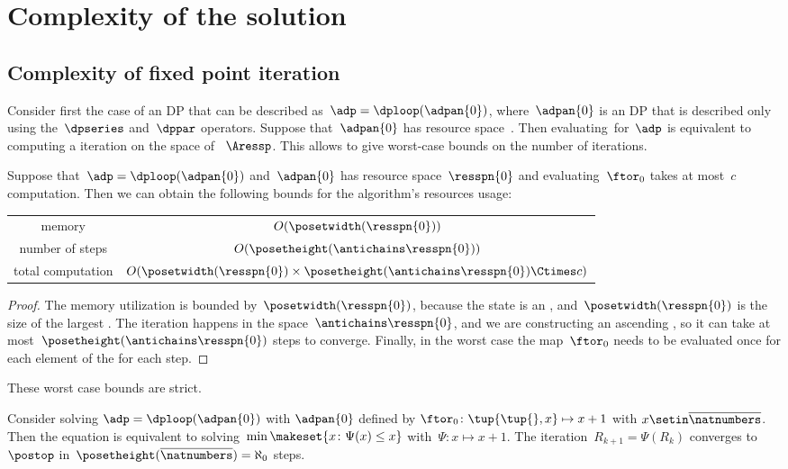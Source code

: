 
\section{Complexity of the solution}

\subsection{Complexity of fixed point iteration}

Consider first the case of an DP that can be described as~$\adp=\dploop(\adpan{0})$, where~$\adpan{0}$ is an DP that is described only using the~$\dpseries$ and~$\dppar$ operators.
Suppose that~$\adpan{0}$ has resource space~\ressp.
Then evaluating~\ftor for~$\adp$ is equivalent to computing a  iteration on the space of  ~$\Aressp$.
This allows to give worst-case bounds on the number of iterations.

\begin{proposition}
    \label{prop:complexity}
    Suppose that~$\adp=\dploop(\adpan{0})$ and~$\adpan{0}$ has resource space~$\resspn{0}$ and evaluating~$\ftor_{0}$ takes at most~$c$ computation.
    Then we can obtain the following bounds for the algorithm's resources usage:

    \smallskip{}
    \begin{tabular}{cc}
        memory            & $O(\posetwidth(\resspn{0}))$\tabularnewline
        number of steps   & $O(\posetheight(\antichains\resspn{0}))$\tabularnewline
        total computation & $O(\posetwidth(\resspn{0})\times\posetheight(\antichains\resspn{0})\Ctimes c)$\tabularnewline
    \end{tabular}

\end{proposition}
\begin{proof}
    The memory utilization is bounded by~$\posetwidth(\resspn{0})$, because the state is an , and~$\posetwidth(\resspn{0})$ is the size of the largest .
    The iteration happens in the space~$\antichains\resspn{0}$, and we are constructing an ascending , so it can take at most~$\posetheight(\antichains\resspn{0})$ steps to converge.
    Finally, in the worst case the map~$\ftor_{0}$ needs to be evaluated once for each element of the  for each step.
\end{proof}
These worst case bounds are strict.
\begin{example}
    Consider solving $\adp=\dploop(\adpan{0})$ with $\adpan{0}$ defined by $\ftor_{0}\colon\tup{ \tup{ },x} \mapsto x+1$ with $x\setin\overline{\natnumbers}$.
    Then the  equation is equivalent to solving~$\min\makeset{x\colon\Psi(x)\leq x}$ with~$\Psi:x\mapsto x+1$.
    The iteration~$R_{k+1}=\Psi(R_{k})$ converges to~$\postop$ in~$\posetheight(\overline{\natnumbers})=\aleph_{0}$ steps.
\end{example}

